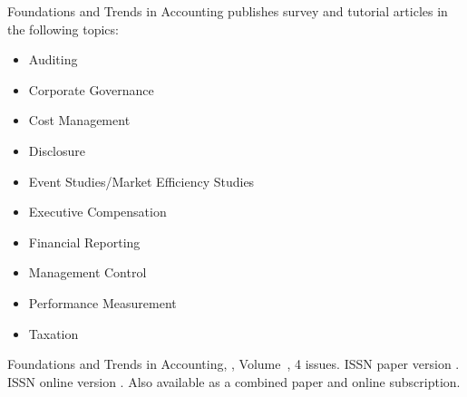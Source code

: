 


\journalaimsandscope
 {%
  Foundations and Trends\textsuperscript{\textregistered} in
  Accounting publishes
 survey and tutorial articles in the following topics:
 \begin{multicols}{2}\raggedcolumns
 \begin{itemize}
\item{Auditing}
\item{Corporate Governance}
\item{Cost Management}
\item{Disclosure}
\item{Event Studies/Market Efficiency Studies}
\item{Executive Compensation}
\item{Financial Reporting}
\item{Management Control}
\item{Performance Measurement}
\item{Taxation}
\end{itemize}
 \end{multicols}
 }


\journallibraryinfo
 {%
  Foundations and Trends\textsuperscript{\textregistered} in
  Accounting, ,
  Volume~, 4 issues.
  ISSN paper version .
  ISSN online version .
  Also available as a combined paper and online
  subscription.
 } 